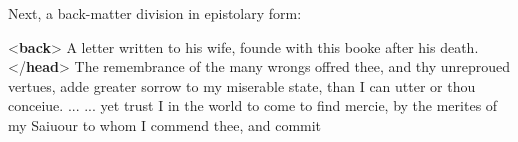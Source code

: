 Next, a back-matter division in epistolary form: \par\bgroup{}\exampleFont \begin{shaded}\noindent\mbox{}{<\textbf{back}>}\mbox{}\newline 
{}\mbox{}\newline 
\hspace*{1em}A letter written to his wife, founde with this booke\mbox{}\newline 
\hspace*{1em}\hspace*{1em}\hspace*{1em}\hspace*{1em} after his death.{</\textbf{head}>}\mbox{}\newline 
\hspace*{1em}The remembrance of the many wrongs offred thee, and thy\mbox{}\newline 
\hspace*{1em}\hspace*{1em}\hspace*{1em}\hspace*{1em} unreproued vertues, adde greater sorrow to my miserable state,\mbox{}\newline 
\hspace*{1em}\hspace*{1em}\hspace*{1em}\hspace*{1em} than I can utter or thou conceiue. ...\mbox{}\newline 
\hspace*{1em}\hspace*{1em}\hspace*{1em}\hspace*{1em} ... yet trust I in the world to come to find mercie, by the\mbox{}\newline 
\hspace*{1em}\hspace*{1em}\hspace*{1em}\hspace*{1em} merites of my Saiuour to whom I commend thee, and commit\mbox{}\newline 

\end{shaded}
